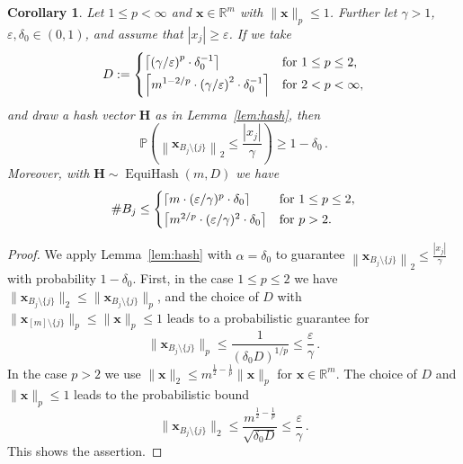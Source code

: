 \documentclass[12pt]{article}
\theoremstyle{plain}
\newtheorem{corollary}[theorem]{Corollary}
\theoremstyle{definition}
\renewcommand{\P}{{\mathbb P}}
\DeclareMathOperator{\EquiHash}{EquiHash}
\newcommand{\eps}{\varepsilon}
\renewcommand{\vec}{\boldsymbol}
\newcommand{\R}{{\mathbb R}}
\begin{document}
\begin{corollary} \label{cor:hash}
    Let $1 \leq p < \infty$
    and $\vec{x} \in \R^m$ with $\|\vec{x}\|_p \leq 1$.
    Further let $\gamma > 1$, $\eps,\delta_0 \in (0,1)$, and assume that $|x_j| \geq \eps$.
    If we take
    \begin{equation*}
        D := \begin{cases}
                \displaystyle
                \left\lceil \left(\gamma/\eps\right)^p \cdot \delta_0^{-1} \right\rceil
                    &\text{for } 1 \leq p \leq 2, \vspace{2pt}\\
                \displaystyle
                \left\lceil m^{1 - 2/p} \cdot \left(\gamma/\eps\right)^2 \cdot \delta_0^{-1} \right\rceil
                    &\text{for } 2 < p < \infty,
            \end{cases}
    \end{equation*}
    and draw a hash vector $\vec{H}$ as in Lemma~\ref{lem:hash},
    then
    \begin{equation*}
        \P\left(\left\|\vec{x}_{B_j\setminus\{j\}}\right\|_2 \leq \frac{|x_j|}{\gamma}\right)
            \geq 1 - \delta_0 \,.
    \end{equation*}
    Moreover, with 
    $\vec{H} \sim \EquiHash(m,D)$
    we have
    \begin{equation*}
        \#B_j \leq \begin{cases}
                        \left\lceil m \cdot (\eps/\gamma)^p \cdot \delta_0 \right\rceil
                            &\text{for } 1 \leq p \leq 2, \vspace{2pt} \\
                        \left\lceil m^{2/p} \cdot (\eps/\gamma)^2 \cdot \delta_0 \right\rceil
                            &\text{for } p > 2.
                    \end{cases}
    \end{equation*}
\end{corollary}
\begin{proof}
    We apply Lemma~\ref{lem:hash} with $\alpha = \delta_0$ to guarantee $\left\|\vec{x}_{B_j\setminus\{j\}}\right\|_2 \leq \frac{|x_j|}{\gamma}$ with probability $1-\delta_0$.
    First, in the case $1 \leq p \leq 2$ we have $\|\vec{x}_{B_j \setminus \{j\}} \|_2 \leq \|\vec{x}_{B_j \setminus \{j\}} \|_p$, and the choice of $D$ with $\|\vec{x}_{[m] \setminus\{j\}}\|_p \leq \|\vec{x}\|_p \leq 1$ leads to a probabilistic guarantee for
    \begin{equation*}
        \|\vec{x}_{B_j \setminus \{j\}} \|_p \leq \frac{1}{(\delta_0 D)^{1/p}} \leq \frac{\eps}{\gamma} \,.
    \end{equation*}
    In the case $p > 2$ we use $\|\vec{x}\|_2 \leq m^{\frac{1}{2} - \frac{1}{p}} \|\vec{x}\|_p$ for $\vec{x} \in \R^m$. 
    The choice of $D$ and $\|\vec{x}\|_p \leq 1$ leads to the probabilistic bound
    \begin{equation*}
        \|\vec{x}_{B_j \setminus \{j\}} \|_2 \leq \frac{m^{\frac{1}{2} - \frac{1}{p}}}{\sqrt{\delta_0 D}} \leq \frac{\eps}{\gamma} \,.
    \end{equation*}
    This shows the assertion.
\end{proof}
\end{document}
